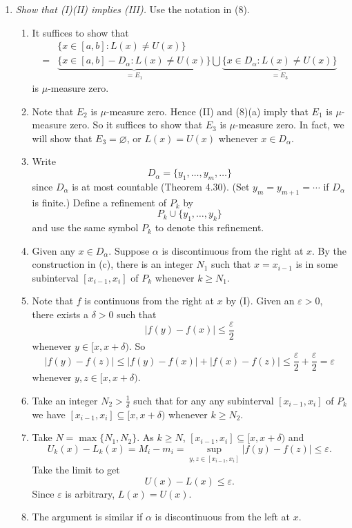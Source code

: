 \documentclass{article}
\begin{document}
\begin{enumerate}
\item[(9)]
  \emph{Show that (I)(II) implies (III).}
  Use the notation in (8).
  \begin{enumerate}
  \item[(a)]
    It suffices to show that
    \begin{align*}
      &\{ x \in [a,b] : L(x) \neq U(x) \} \\
      =& \underbrace{\{ x \in [a,b] - D_{\alpha} : L(x) \neq U(x) \}}_{= E_1}
      \bigcup
        \underbrace{\{ x \in D_{\alpha} : L(x) \neq U(x) \}}_{= E_3}
    \end{align*}
    is $\mu$-measure zero.

  \item[(b)]
    Note that $E_2$ is $\mu$-measure zero.
    Hence (II) and (8)(a) imply that $E_1$ is $\mu$-measure zero.
    So it suffices to show that $E_3$ is $\mu$-measure zero.
    In fact, we will show that $E_3 = \varnothing$,
    or $L(x) = U(x)$ whenever $x \in D_{\alpha}$.

  \item[(c)]
    Write
    \[
      D_{\alpha} = \{ y_1, \ldots, y_m, \ldots \}
    \]
    since $D_{\alpha}$ is at most countable (Theorem 4.30).
    (Set $y_m = y_{m+1} = \cdots$ if $D_{\alpha}$ is finite.)
    Define a refinement of $P_k$ by
    \[
      P_k \cup \{ y_1, \ldots, y_k \}
    \]
    and use the same symbol $P_k$ to denote this refinement.

  \item[(d)]
    Given any $x \in D_{\alpha}$.
    Suppose $\alpha$ is discontinuous from the right at $x$.
    By the construction in (c),
    there is an integer $N_1$ such that
    $x = x_{i-1}$ is in some subinterval $[x_{i-1},x_{i}]$ of $P_k$
    whenever $k \geq N_1$.

  \item[(e)]
    Note that $f$ is continuous from the right at $x$ by (I).
    Given an $\varepsilon > 0$, there exists a $\delta > 0$ such that
    \[
      |f(y) - f(x)| \leq \frac{\varepsilon}{2}
    \]
    whenever $y \in [x,x+\delta)$.
    So
    \[
      |f(y) - f(z)|
      \leq |f(y) - f(x)| + |f(x) - f(z)|
      \leq \frac{\varepsilon}{2} + \frac{\varepsilon}{2}
      = \varepsilon
    \]
    whenever $y, z \in [x,x+\delta)$.

  \item[(f)]
    Take an integer $N_2 > \frac{1}{\delta}$ such that
    for any any subinterval $[x_{i-1},x_{i}]$ of $P_k$ we have
    $[x_{i-1},x_{i}] \subseteq [x,x+\delta)$ whenever $k \geq N_2$.

  \item[(g)]
    Take $N = \max\{ N_1, N_2 \}$.
    As $k \geq N$, $[x_{i-1},x_{i}] \subseteq [x,x+\delta)$ and
    \[
      U_k(x) - L_k(x)
      = M_i - m_i
      = \sup_{y,z \in [x_{i-1},x_{i}]} |f(y) - f(z)|
      \leq \varepsilon.
    \]
    Take the limit to get
    \[
      U(x) - L(x) \leq \varepsilon.
    \]
    Since $\varepsilon$ is arbitrary, $L(x) = U(x)$.

  \item[(h)]
    The argument is similar if $\alpha$ is discontinuous from the left at $x$.
  \end{enumerate}
\end{enumerate}
\end{document}
